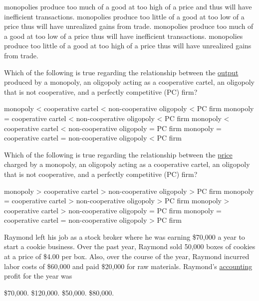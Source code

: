 \documentclass[addpoints,11pt]{exam}
\theoremstyle{definition}
\begin{document}
\begin{questions}
\begin{choices}
	\choice monopolies produce too much of a good at too high of a price and thus will have inefficient transactions.
	\choice monopolies produce too little of a good at too low of a price thus will have unrealized gains from trade.
	\choice monopolies produce too much of a good at too low of a price thus will have inefficient transactions.
	\CorrectChoice monopolies produce too little of a good at too high of a price thus will have unrealized gains from trade.
\end{choices}

\newpage

\question Which of the following is true regarding the relationship between the \underline{output} produced by a monopoly, an oligopoly acting as a cooperative cartel, an oligopoly that is not cooperative, and a perfectly competitive (PC) firm?

\begin{choices}
	\choice monopoly < cooperative cartel < non-cooperative oligopoly < PC firm
	\CorrectChoice  monopoly = cooperative cartel < non-cooperative oligopoly < PC firm
	\choice  monopoly < cooperative cartel < non-cooperative oligopoly = PC firm
	\choice  monopoly = cooperative cartel = non-cooperative oligopoly < PC firm
\end{choices}

\question Which of the following is true regarding the relationship between the \underline{price} charged by a monopoly, an oligopoly acting as a cooperative cartel, an oligopoly that is not cooperative, and a perfectly competitive (PC) firm?

\begin{choices}
	\choice monopoly > cooperative cartel > non-cooperative oligopoly > PC firm
	\CorrectChoice  monopoly = cooperative cartel > non-cooperative oligopoly > PC firm
	\choice  monopoly > cooperative cartel > non-cooperative oligopoly = PC firm
	\choice  monopoly = cooperative cartel = non-cooperative oligopoly > PC firm
\end{choices}

\question Raymond left his job as a stock broker where he was earning \$70,000 a year to start a cookie business. Over the past year, Raymond sold 50,000 boxes of cookies at a price of \$4.00 per box. Also, over the course of the year, Raymond incurred labor costs of \$60,000 and paid \$20,000 for raw materials. Raymond's \underline{accounting} profit for the year was 

\begin{choices}
	\choice \$70,000.
	\CorrectChoice \$120,000.
	\choice \$50,000.
	\choice \$80,000.
\end{choices}



\end{questions}
\end{document}
